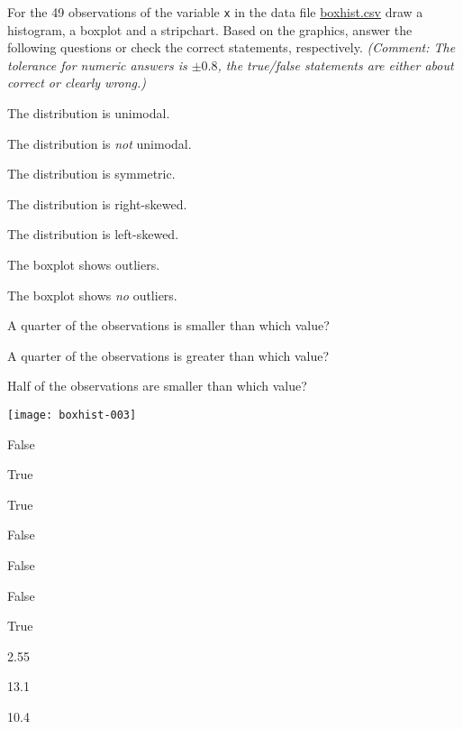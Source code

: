 
\begin{question}
For the 49 observations of the variable \texttt{x} in the data file
\url{boxhist.csv} draw a histogram, a boxplot and a stripchart.
Based on the graphics, answer the following questions or check the correct
statements, respectively. \emph{(Comment: The tolerance for numeric answers is
$\pm0.8$, the true/false statements are either about correct or clearly wrong.)}
\begin{answerlist}
  \item The distribution is unimodal.
  \item The distribution is \emph{not} unimodal.
  \item The distribution is symmetric.
  \item The distribution is right-skewed.
  \item The distribution is left-skewed.
  \item The boxplot shows outliers.
  \item The boxplot shows \emph{no} outliers.
  \item A quarter of the observations is smaller than which value?
  \item A quarter of the observations is greater than which value?
  \item Half of the observations are smaller than which value?
\end{answerlist}
\end{question}

\begin{solution}
\texttt{[image: boxhist-003]}

\begin{answerlist}
  \item False
  \item True
  \item True
  \item False
  \item False
  \item False
  \item True
  \item 2.55
  \item 13.1
  \item 10.4
\end{answerlist}
\end{solution}

